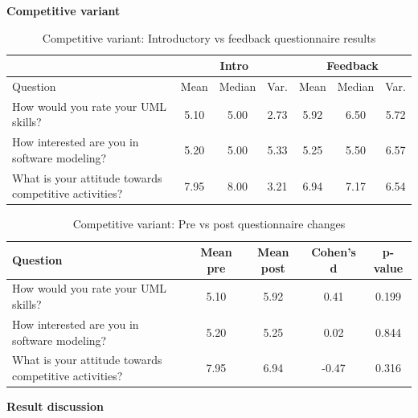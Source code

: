 \textbf{Competitive variant}


\FloatBarrier
\begin{table}[h]
\centering
\small
\renewcommand{\arraystretch}{1.2}
\begin{tabular}{>{\raggedright\arraybackslash}p{6cm}|ccc|ccc}
\hline
 & \multicolumn{3}{c|}{Intro} & \multicolumn{3}{c}{Feedback} \\
\hline
Question & Mean & Median & Var. & Mean & Median & Var. \\
\hline

How would you rate your UML skills?
& 5.10 & 5.00 & 2.73 & 5.92 & 6.50 & 5.72 \\

How interested are you in software modeling?
& 5.20 & 5.00 & 5.33 & 5.25 & 5.50 & 6.57 \\

What is your attitude towards competitive activities?
& 7.95 & 8.00 & 3.21 & 6.94 & 7.17 & 6.54 \\

\hline
\end{tabular}
\caption{Competitive variant: Introductory vs feedback questionnaire results}
\end{table}
\FloatBarrier


\FloatBarrier
\begin{table}[h]
\centering
\small
\renewcommand{\arraystretch}{1.2}
\begin{tabular}{>{\raggedright\arraybackslash}p{6cm}|cccc}
\hline
Question & Mean pre & Mean post & Cohen's d & p-value \\
\hline

How would you rate your UML skills?
& 5.10 & 5.92 & 0.41 & 0.199 \\

How interested are you in software modeling?
& 5.20 & 5.25 & 0.02 & 0.844 \\

What is your attitude towards competitive activities?
& 7.95 & 6.94 & -0.47 & 0.316 \\

\hline
\end{tabular}
\caption{Competitive variant: Pre vs post questionnaire changes}
\end{table}
\FloatBarrier

\textbf{Result discussion}